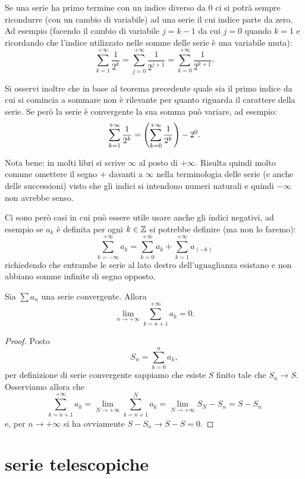 Se una serie ha
primo termine con un indice diverso da $0$
ci si potrà sempre ricondurre (con un cambio di variabile)
ad una serie il cui indice parte da zero. Ad esempio
(facendo il cambio di variabile $j=k-1$ da cui $j=0$ quando $k=1$
e ricordando che l'indice utilizzato nelle somme delle
serie è una variabile muta):
\[
 \sum_{k=1}^{+\infty} \frac{1}{2^k}
 = \sum_{j=0}^{+\infty} \frac{1}{2^{j+1}}
 = \sum_{k=0}^{+\infty} \frac{1}{2^{k+1}}.
\]

Si osservi inoltre che in base al teorema precedente quale sia il primo indice
da cui si comincia a sommare non è rilevante per quanto riguarda il carattere della serie.
Se però la serie è convergente la sua somma può variare, ad esempio:
\[
 \sum_{k=1}^{+\infty} \frac{1}{2^k}
 = {\left( \sum_{k=0}^{+\infty} \frac{1}{2^k} \right)} - 2^0.
\]

Nota bene: in molti libri si scrive $\infty$ al posto di $+\infty$.
Risulta quindi molto comune omettere il segno $+$ davanti a $\infty$
nella terminologia delle serie (e anche delle successioni) visto
che gli indici si intendono numeri naturali e quindi $-\infty$ non avrebbe
senso.

Ci sono però casi in cui può essere utile usare anche gli indici negativi,
ad esempio
se $a_k$ è definita per ogni $k\in {\mathbb Z}$
si potrebbe definire (ma non lo faremo):
\[
  \sum_{k=-\infty}^{+\infty} a_k
  = \sum_{k=0}^{+\infty} a_k +
  \sum_{k=1}^{+\infty} a_{(-k)}
\]
richiedendo che entrambe le serie al lato destro
dell'uguaglianza esistano e non abbiano somme infinite di segno opposto.

\begin{theorem}
\label{th:coda}%
\mymark{*}%
Sia $\sum a_n$ una serie convergente. Allora
\[
  \lim_{n\to +\infty} \sum_{k=n+1}^{+\infty} a_k = 0.
\]
\end{theorem}
%
\begin{proof}
\mymark{*}
Posto
\[
  S_n = \sum_{k=0}^n a_k,
\]
per definizione di serie convergente sappiamo che esiste $S$ finito
tale che $S_n \to S$. Osserviamo allora che
\[
  \sum_{k=n+1}^{+\infty} a_k = \lim_{N\to+\infty} \sum_{k=n+1}^N a_k
   = \lim_{N\to +\infty} S_N - S_n = S - S_n
\]
e, per $n\to +\infty$ si ha ovviamente $S - S_n \to S - S = 0$.
\end{proof}

\section{serie telescopiche}


